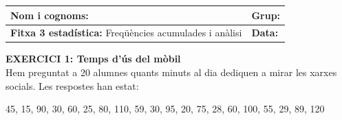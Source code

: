 \documentclass[12pt,a4paper]{article}
\begin{document}
\begingroup
\renewcommand{\arraystretch}{2.2}
\begin{tabularx}{\textwidth}{|X|p{4cm}|}
    \hline
    \textbf{Nom i cognoms:} & \textbf{Grup:} \\ \hline
    \textbf{Fitxa 3 estadística:} Freqüències acumulades i anàlisi & \textbf{Data:} \\ \hline
\end{tabularx}
\endgroup

\vspace{0.4cm}

\noindent \textbf{EXERCICI 1: Temps d'ús del mòbil} \\
Hem preguntat a 20 alumnes quants minuts al dia dediquen a mirar les xarxes socials. Les respostes han estat:
\begin{center}
45, 15, 90, 30, 60, 25, 80, 110, 59, 30, 95, 20, 75, 28, 60, 100, 55, 29, 89, 120
\end{center}
\end{document}
